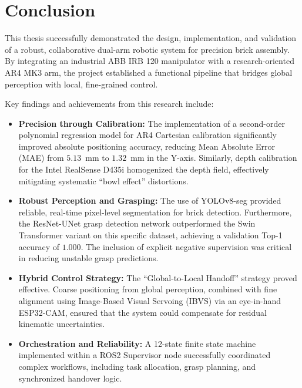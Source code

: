 \section{Conclusion}

This thesis successfully demonstrated the design, implementation, and validation of a robust, collaborative dual-arm robotic system for precision brick assembly. By integrating an industrial ABB IRB 120 manipulator with a research-oriented AR4 MK3 arm, the project established a functional pipeline that bridges global perception with local, fine-grained control.

Key findings and achievements from this research include:

\begin{itemize}
    \item \textbf{Precision through Calibration:} The implementation of a second-order polynomial regression model for AR4 Cartesian calibration significantly improved absolute positioning accuracy, reducing Mean Absolute Error (MAE) from $5.13$~mm to $1.32$~mm in the Y-axis. Similarly, depth calibration for the Intel RealSense D435i homogenized the depth field, effectively mitigating systematic ``bowl effect'' distortions.
    
    \item \textbf{Robust Perception and Grasping:} The use of YOLOv8-seg provided reliable, real-time pixel-level segmentation for brick detection. Furthermore, the ResNet-UNet grasp detection network outperformed the Swin Transformer variant on this specific dataset, achieving a validation Top-1 accuracy of $1.000$. The inclusion of explicit negative supervision was critical in reducing unstable grasp predictions.
    
    \item \textbf{Hybrid Control Strategy:} The ``Global-to-Local Handoff'' strategy proved effective. Coarse positioning from global perception, combined with fine alignment using Image-Based Visual Servoing (IBVS) via an eye-in-hand ESP32-CAM, ensured that the system could compensate for residual kinematic uncertainties.
    
    \item \textbf{Orchestration and Reliability:} A 12-state finite state machine implemented within a ROS2 Supervisor node successfully coordinated complex workflows, including task allocation, grasp planning, and synchronized handover logic.
\end{itemize}
\clearpage